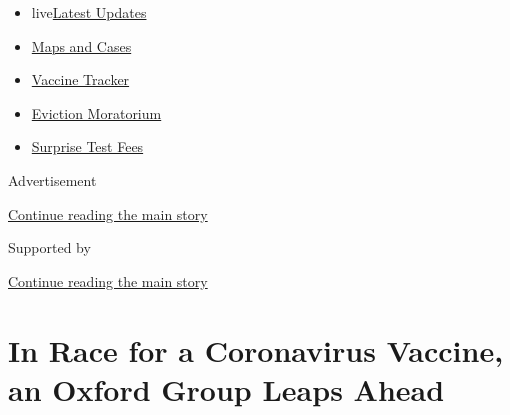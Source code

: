 \begin{itemize}
\tightlist
\item
  live\href{https://www.nytimes3xbfgragh.onion/2020/09/09/world/covid-19-coronavirus.html?name=styln-coronavirus-national\&region=TOP_BANNER\&block=storyline_menu_recirc\&action=click\&pgtype=Article\&impression_id=948b6371-f2a5-11ea-b679-9b7eacb7021f\&variant=undefined}{Latest
  Updates}
\item
  \href{https://www.nytimes3xbfgragh.onion/interactive/2020/us/coronavirus-us-cases.html?name=styln-coronavirus-national\&region=TOP_BANNER\&block=storyline_menu_recirc\&action=click\&pgtype=Article\&impression_id=948b6372-f2a5-11ea-b679-9b7eacb7021f\&variant=undefined}{Maps
  and Cases}
\item
  \href{https://www.nytimes3xbfgragh.onion/interactive/2020/science/coronavirus-vaccine-tracker.html?name=styln-coronavirus-national\&region=TOP_BANNER\&block=storyline_menu_recirc\&action=click\&pgtype=Article\&impression_id=948b6373-f2a5-11ea-b679-9b7eacb7021f\&variant=undefined}{Vaccine
  Tracker}
\item
  \href{https://www.nytimes3xbfgragh.onion/2020/09/02/your-money/eviction-moratorium-covid.html?name=styln-coronavirus-national\&region=TOP_BANNER\&block=storyline_menu_recirc\&action=click\&pgtype=Article\&impression_id=948b8a80-f2a5-11ea-b679-9b7eacb7021f\&variant=undefined}{Eviction
  Moratorium}
\item
  \href{https://www.nytimes3xbfgragh.onion/2020/09/09/upshot/coronavirus-surprise-test-fees.html?name=styln-coronavirus-national\&region=TOP_BANNER\&block=storyline_menu_recirc\&action=click\&pgtype=Article\&impression_id=948b8a81-f2a5-11ea-b679-9b7eacb7021f\&variant=undefined}{Surprise
  Test Fees}
\end{itemize}

Advertisement

\protect\hyperlink{after-top}{Continue reading the main story}

Supported by

\protect\hyperlink{after-sponsor}{Continue reading the main story}

\hypertarget{in-race-for-a-coronavirus-vaccine-an-oxford-group-leaps-ahead}{%
\section{In Race for a Coronavirus Vaccine, an Oxford Group Leaps
Ahead}\label{in-race-for-a-coronavirus-vaccine-an-oxford-group-leaps-ahead}}


